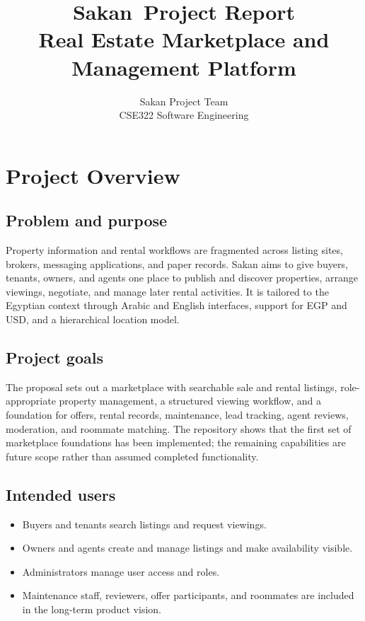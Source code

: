 \documentclass[11pt,a4paper]{article}
\title{Sakan\ Project Report\\\large Real Estate Marketplace and Management Platform}
\author{Sakan Project Team\\CSE322 Software Engineering}
\date{}
\begin{document}
\maketitle
\tableofcontents
\newpage

\section{Project Overview}
\subsection{Problem and purpose}
Property information and rental workflows are fragmented across listing sites, brokers, messaging applications, and paper records. Sakan aims to give buyers, tenants, owners, and agents one place to publish and discover properties, arrange viewings, negotiate, and manage later rental activities. It is tailored to the Egyptian context through Arabic and English interfaces, support for EGP and USD, and a hierarchical location model.

\subsection{Project goals}
The proposal sets out a marketplace with searchable sale and rental listings, role-appropriate property management, a structured viewing workflow, and a foundation for offers, rental records, maintenance, lead tracking, agent reviews, moderation, and roommate matching. The repository shows that the first set of marketplace foundations has been implemented; the remaining capabilities are future scope rather than assumed completed functionality.

\subsection{Intended users}
\begin{itemize}
  \item Buyers and tenants search listings and request viewings.
  \item Owners and agents create and manage listings and make availability visible.
  \item Administrators manage user access and roles.
  \item Maintenance staff, reviewers, offer participants, and roommates are included in the long-term product vision.
\end{itemize}
\end{document}
